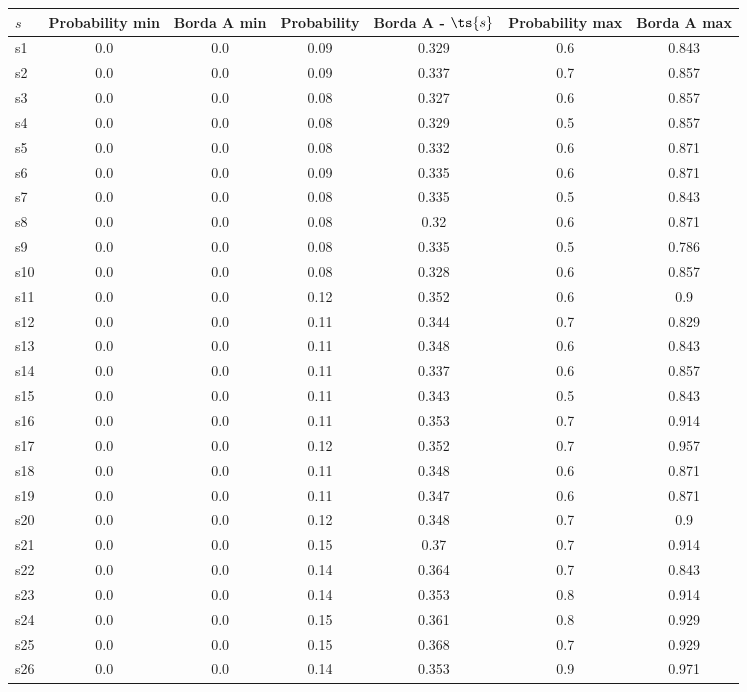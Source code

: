 \documentclass{article}
\begin{document}
\noindent\begin{tabular}{|l|c|c|c|c|c|c|}
\hline
$s$& Probability min & Borda A min & Probability & Borda A - $\ts{s}$ & Probability max & Borda A max\\
\hline
s1 &0.0 & 0.0 & 0.09 & 0.329 & 0.6 & 0.843\\
\hline
s2 &0.0 & 0.0 & 0.09 & 0.337 & 0.7 & 0.857\\
\hline
s3 &0.0 & 0.0 & 0.08 & 0.327 & 0.6 & 0.857\\
\hline
s4 &0.0 & 0.0 & 0.08 & 0.329 & 0.5 & 0.857\\
\hline
s5 &0.0 & 0.0 & 0.08 & 0.332 & 0.6 & 0.871\\
\hline
s6 &0.0 & 0.0 & 0.09 & 0.335 & 0.6 & 0.871\\
\hline
s7 &0.0 & 0.0 & 0.08 & 0.335 & 0.5 & 0.843\\
\hline
s8 &0.0 & 0.0 & 0.08 & 0.32 & 0.6 & 0.871\\
\hline
s9 &0.0 & 0.0 & 0.08 & 0.335 & 0.5 & 0.786\\
\hline
s10 &0.0 & 0.0 & 0.08 & 0.328 & 0.6 & 0.857\\
\hline
s11 &0.0 & 0.0 & 0.12 & 0.352 & 0.6 & 0.9\\
\hline
s12 &0.0 & 0.0 & 0.11 & 0.344 & 0.7 & 0.829\\
\hline
s13 &0.0 & 0.0 & 0.11 & 0.348 & 0.6 & 0.843\\
\hline
s14 &0.0 & 0.0 & 0.11 & 0.337 & 0.6 & 0.857\\
\hline
s15 &0.0 & 0.0 & 0.11 & 0.343 & 0.5 & 0.843\\
\hline
s16 &0.0 & 0.0 & 0.11 & 0.353 & 0.7 & 0.914\\
\hline
s17 &0.0 & 0.0 & 0.12 & 0.352 & 0.7 & 0.957\\
\hline
s18 &0.0 & 0.0 & 0.11 & 0.348 & 0.6 & 0.871\\
\hline
s19 &0.0 & 0.0 & 0.11 & 0.347 & 0.6 & 0.871\\
\hline
s20 &0.0 & 0.0 & 0.12 & 0.348 & 0.7 & 0.9\\
\hline
s21 &0.0 & 0.0 & 0.15 & 0.37 & 0.7 & 0.914\\
\hline
s22 &0.0 & 0.0 & 0.14 & 0.364 & 0.7 & 0.843\\
\hline
s23 &0.0 & 0.0 & 0.14 & 0.353 & 0.8 & 0.914\\
\hline
s24 &0.0 & 0.0 & 0.15 & 0.361 & 0.8 & 0.929\\
\hline
s25 &0.0 & 0.0 & 0.15 & 0.368 & 0.7 & 0.929\\
\hline
s26 &0.0 & 0.0 & 0.14 & 0.353 & 0.9 & 0.971\\

\end{tabular}
\end{document}
